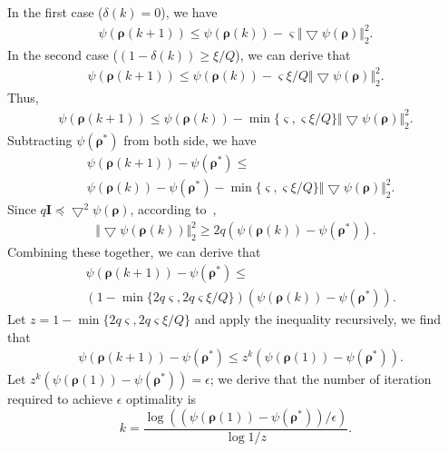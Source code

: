 \documentclass[journal]{IEEEtran}
\theoremstyle{definition}
\begin{document}
In the first case ($\delta(k)=0$), we have
\begin{align}
\psi(\boldsymbol{\rho}(k+1))\leq \psi(\boldsymbol{\rho}(k))-\varsigma\Vert\bigtriangledown\psi(\boldsymbol{\rho})\Vert^{2}_{2}.
\end{align}
In the second case ($(1-\delta(k))\geq \xi/Q$), we can derive that
\begin{align}
\psi(\boldsymbol{\rho}(k+1))\leq \psi(\boldsymbol{\rho}(k))-\varsigma\xi/Q\Vert\bigtriangledown\psi(\boldsymbol{\rho})\Vert^{2}_{2}.
\end{align}
Thus,
\begin{align}
\psi(\boldsymbol{\rho}(k+1))\leq \psi(\boldsymbol{\rho}(k))-\min\{\varsigma,\varsigma\xi/Q\}\Vert\bigtriangledown\psi(\boldsymbol{\rho})\Vert^{2}_{2}.
\end{align}
Subtracting $\psi(\boldsymbol{\rho}^{*})$ from both side, we have
\begin{align}
&\psi(\boldsymbol{\rho}(k+1))-\psi(\boldsymbol{\rho}^{*})\leq \nonumber\\ &\psi(\boldsymbol{\rho}(k))-\psi(\boldsymbol{\rho}^{*})-\min\{\varsigma,\varsigma\xi/Q\}\Vert\bigtriangledown\psi(\boldsymbol{\rho})\Vert^{2}_{2}.
\end{align}
Since $q\boldsymbol{I} \preceq\bigtriangledown^{2}\psi(\boldsymbol{\rho})$, according to~\cite{Boyd:2004:CVX},
\begin{align}
\Vert\bigtriangledown\psi(\boldsymbol{\rho}(k))\Vert^{2}_{2}\geq 2q(\psi(\boldsymbol{\rho}(k))-\psi(\boldsymbol{\rho}^{*})).
\end{align}
Combining these together, we can derive that
\begin{align}
&\psi(\boldsymbol{\rho}(k+1))-\psi(\boldsymbol{\rho}^{*})\leq \nonumber\\
&(1-\min\{2q\varsigma,2q\varsigma\xi/Q\})(\psi(\boldsymbol{\rho}(k))-\psi(\boldsymbol{\rho}^{*})).
\end{align}
Let $z=1-\min\{2q\varsigma,2q\varsigma\xi/Q\}$ and apply the inequality recursively, we find that
\begin{align}
&\psi(\boldsymbol{\rho}(k+1))-\psi(\boldsymbol{\rho}^{*})\leq z^{k}(\psi(\boldsymbol{\rho}(1))-\psi(\boldsymbol{\rho}^{*})).
\end{align}
Let $z^{k}(\psi(\boldsymbol{\rho}(1))-\psi(\boldsymbol{\rho}^{*}))=\epsilon$; we derive that the number of iteration required to achieve $\epsilon$ optimality is
\begin{equation}
k=\frac{\log((\psi(\boldsymbol{\rho}(1))-\psi(\boldsymbol{\rho}^{*}))/\epsilon)}{\log{1/z}}.
\end{equation}


\end{document}
